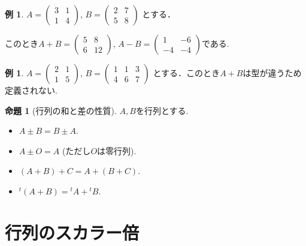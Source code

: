 \documentclass[dvipdfmx,a4paper,11pt]{article}
\theoremstyle{definition}
\newtheorem{prop}[thm]{命題}
\newtheorem{exa}[thm]{例}
\begin{document}
\begin{exa}
 $A = 
 \begin{pmatrix}
 3&1 \\
 1&4
 \end{pmatrix}
 $, 
 $
 B = 
 \begin{pmatrix}
 2&7\\
 5&8
 \end{pmatrix}
 $
 とする．
 
 このとき$
 A+B =
 \begin{pmatrix}
 5&8 \\
6&12
 \end{pmatrix}
 $, 
 $
  A-B =
 \begin{pmatrix}
 1&-6 \\
 -4&-4
 \end{pmatrix}
 $である.
 \end{exa}
 
 \begin{exa}
 $A = 
 \begin{pmatrix}
 2&1 \\
 1&5
 \end{pmatrix}
 $,
$ 
 B = 
 \begin{pmatrix}
 1&1 &3 \\
 4&6 & 7
 \end{pmatrix}
 $
 とする．このとき$A+B$は型が違うため定義されない. 
 \end{exa}
 
 \begin{tcolorbox}[
    colback = white,
    colframe = green!35!black,
    fonttitle = \bfseries,
    breakable = true]
    \begin{prop}[行列の和と差の性質]
$A, B$を行列とする.
 \begin{itemize}
 \item $A\pm B =B\pm A$.
  \item $A\pm O =A$ (ただし$O$は零行列).
  \item $(A+B)+C =A + (B+C)$.
  \item ${}^{t}(A+B) = {}^{t}A+ {}^{t}B$.
 \end{itemize}
  \end{prop}
 \end{tcolorbox}
 
 \section{行列のスカラー倍}
 
\end{document}
